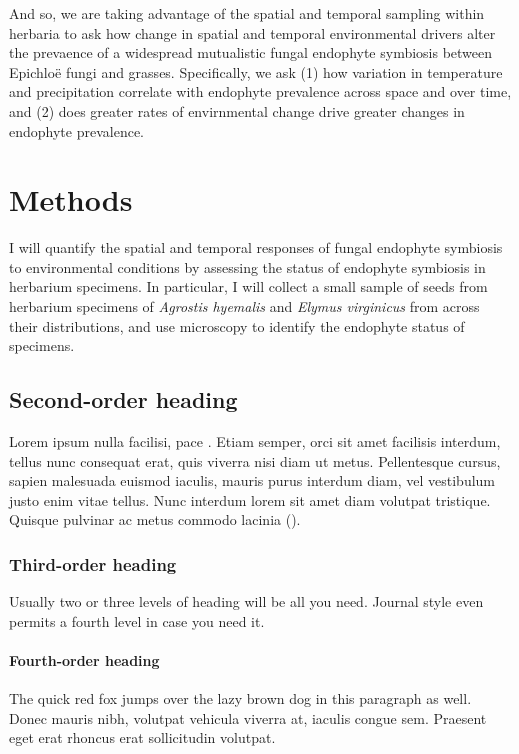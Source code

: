 \documentclass[11pt]{article}
\begin{document}
And so, we are taking advantage of the spatial and temporal sampling within herbaria to ask how change in spatial and temporal environmental drivers alter the prevaence of a widespread mutualistic fungal endophyte symbiosis between Epichloë fungi and grasses. 
Specifically,  we ask (1) how variation in temperature and precipitation correlate with endophyte prevalence across space and over time, and (2) does greater rates of envirnmental change drive greater changes in endophyte prevalence.
	
	\section*{Methods}
	
I will quantify the spatial and temporal responses of fungal endophyte symbiosis to environmental conditions by assessing the status of endophyte symbiosis in herbarium specimens. 
In particular, I will collect a small sample of seeds from herbarium specimens of \emph{Agrostis hyemalis} and \emph{Elymus virginicus} from across their distributions, and use microscopy to identify the endophyte status of specimens.
	\subsection*{Second-order heading}
	
	Lorem ipsum nulla facilisi, pace \citet{LemKapEx07}. Etiam semper, orci sit amet facilisis interdum, tellus nunc consequat erat, quis viverra nisi diam ut metus. Pellentesque cursus, sapien malesuada euismod iaculis, mauris purus interdum diam, vel vestibulum justo enim vitae tellus. Nunc interdum lorem sit amet diam volutpat tristique. Quisque pulvinar ac metus commodo lacinia (\citealt{Ing11,Xiao2015}).  
	
	\subsubsection*{Third-order heading}
	
	Usually two or three levels of heading will be all you need. Journal style even permits a fourth level in case you need it.
	
	\paragraph*{Fourth-order heading}
	The quick red fox jumps over the lazy brown dog in this paragraph as well. Donec mauris nibh, volutpat vehicula viverra at, iaculis congue sem. Praesent eget erat rhoncus erat sollicitudin volutpat. 
	
\end{document}
